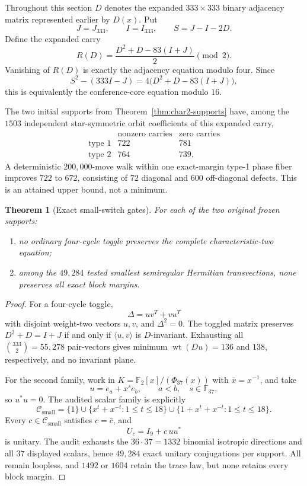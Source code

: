 \documentclass[11pt]{article}
\newtheorem{theorem}{Theorem}[section]
\theoremstyle{definition}
\newcommand{\F}{\mathbb{F}}
\newcommand{\wt}{\operatorname{wt}}
\begin{document}
Throughout this section \(D\) denotes the expanded \(333\times333\)
binary adjacency matrix represented earlier by \(D(x)\).  Put
\[
 J=J_{333},\qquad I=I_{333},\qquad S=J-I-2D.
\]
Define the expanded carry
\[
R(D)=
\frac{D^2+D-83(I+J)}{2}\pmod2.
\tag{10.1}\label{eq:carry}
\]
Vanishing of \(R(D)\) is exactly the adjacency equation modulo four.
Since
\[
S^2-(333I-J)
=4\bigl(D^2+D-83(I+J)\bigr),
\]
this is equivalently the conference-core equation modulo \(16\).

The two initial supports from Theorem~\ref{thm:char2-supports} have,
among the \(1503\) independent star-symmetric orbit coefficients of this
expanded carry,
\[
\begin{array}{c|cc}
&\text{nonzero carries}&\text{zero carries}\\ \hline
\text{type 1}&722&781\\
\text{type 2}&764&739.
\end{array}
\tag{10.2}\label{eq:initial-carries}
\]
A deterministic \(200{,}000\)-move walk within one exact-margin type-1
phase fiber improves \(722\) to \(672\), consisting of \(72\) diagonal
and \(600\) off-diagonal defects.  This is an attained upper bound, not a
minimum.

\begin{theorem}[Exact small-switch gates]
\label{thm:switch-gates}
For each of the two original frozen supports:
\begin{enumerate}[label=(\alph*)]
\item no ordinary four-cycle toggle preserves the complete
characteristic-two equation;
\item among the \(49{,}284\) tested smallest semiregular Hermitian
transvections, none preserves all exact block margins.
\end{enumerate}
\end{theorem}

\begin{proof}
For a four-cycle toggle,
\[
\Delta=uv^T+vu^T
\]
with disjoint weight-two vectors \(u,v\), and \(\Delta^2=0\).
The toggled matrix preserves \(D^2+D=I+J\) if and only if
\(\langle u,v\rangle\) is \(D\)-invariant.  Exhausting all
\(\binom{333}{2}=55{,}278\) pair-vectors gives minimum
\(\wt(Du)=136\) and \(138\), respectively, and no invariant plane.

For the second family, work in
\(K=\F_2[x]/(\Phi_{37}(x))\) with \(\bar x=x^{-1}\), and take
\[
u=e_a+x^se_b,\qquad a<b,\quad s\in\F_{37},
\]
so \(u^*u=0\).  The audited scalar family is explicitly
\[
\mathcal C_{\mathrm{small}}
=\{1\}\cup
\{x^t+x^{-t}:1\leq t\leq18\}\cup
\{1+x^t+x^{-t}:1\leq t\leq18\}.
\]
Every \(c\in\mathcal C_{\mathrm{small}}\) satisfies \(c=\bar c\), and
\[
 U_c=I_9+c\,uu^*
\]
is unitary.  The audit exhausts the
\(36\cdot37=1332\) binomial isotropic directions and all \(37\) displayed
scalars, hence \(49{,}284\) exact unitary conjugations per support.  All
remain loopless, and
\(1492\) or \(1604\) retain the trace law, but none retains every block
margin.
\end{proof}
\end{document}
